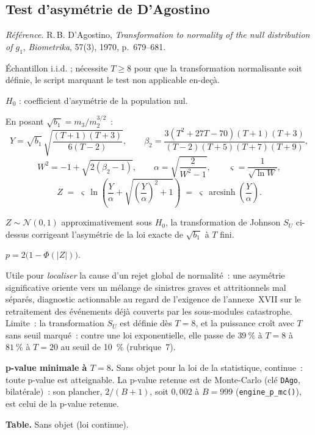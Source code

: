 \documentclass[a4paper,11pt]{article}
\newcommand{\code}[1]{\texttt{\small #1}}
\newcommand{\refl}[1]{{\small\textcolor{maincolor!70!black}{\textit{Référence.} #1}}\par\smallskip}
\newcounter{ficheid}
\newenvironment{fiche}[1]{%
  \stepcounter{ficheid}%
  \phantomsection
  \subsection{#1}%
  \label{fiche:\theficheid}%
}{%
  \end{description}\vspace{0.5em}%
}
\newcommand{\Cadre}{%
  \begin{description}[leftmargin=0pt, style=unboxed, itemsep=3pt, topsep=3pt, parsep=2pt]%
  \item[\textcolor{financeblue}{\textbf{1. Cadre, notations et hypothèses de validité (non testées).}}]}
\newcommand{\Hzero}{\item[\textcolor{financeblue}{\textbf{2. Hypothèse nulle.}}]}
\newcommand{\Stat}{\item[\textcolor{financeblue}{\textbf{3. Statistique de test.}}]}
\newcommand{\Loi}{\item[\textcolor{financeblue}{\textbf{4. Loi sous $H_0$.}}]}
\newcommand{\Pval}{\item[\textcolor{financeblue}{\textbf{5. p-value.}}]}
\newcommand{\Usage}{\item[\textcolor{financeblue}{\textbf{6. Usage et limites.}}]}
\newcommand{\Pertinence}{\item[\textcolor{financeblue}{\textbf{7. Pertinence et puissance à faible $T$.}}]}
\begin{document}
\begin{fiche}{Test d'asymétrie de D'Agostino}
\label{fiche:dagostino-asymetrie}%
\refl{R.\,B. D'Agostino, \emph{Transformation to normality of the null distribution of $g_1$},
\emph{Biometrika}, 57(3), 1970, p.~679--681.}
\Cadre
Échantillon i.i.d. ; nécessite $T \ge 8$ pour que la transformation normalisante soit définie, le
script marquant le test non applicable en-deçà.
\Hzero
$H_0$ : coefficient d'asymétrie de la population nul.
\Stat
En posant $\sqrt{b_1} = m_3/m_2^{3/2}$~:
\[
  Y = \sqrt{b_1}\,\sqrt{\frac{(T+1)(T+3)}{6(T-2)}},
  \qquad
  \beta_2 = \frac{3(T^2+27T-70)(T+1)(T+3)}{(T-2)(T+5)(T+7)(T+9)},
\]
\[
  W^2 = -1 + \sqrt{2(\beta_2-1)},\qquad
  \alpha = \sqrt{\frac{2}{W^2-1}},\qquad
  \varsigma = \frac{1}{\sqrt{\ln W}},
\]
\[
  Z \;=\; \varsigma \,\ln\!\left(\frac{Y}{\alpha} + \sqrt{\left(\frac{Y}{\alpha}\right)^2 + 1}\right)
    \;=\; \varsigma\,\operatorname{arcsinh}\!\left(\frac{Y}{\alpha}\right).
\]
\Loi
$Z \sim \mathcal{N}(0,1)$ approximativement sous $H_0$, la transformation de Johnson $S_U$
ci-dessus corrigeant l'asymétrie de la loi exacte de $\sqrt{b_1}$ à $T$ fini.
\Pval
$p = 2\big(1 - \Phi(|Z|)\big)$.
\Usage
Utile pour \emph{localiser} la cause d'un rejet global de normalité~: une asymétrie significative
oriente vers un mélange de sinistres graves et attritionnels mal séparés, diagnostic actionnable
au regard de l'exigence de l'annexe~XVII sur le retraitement des événements déjà couverts par les
sous-modules catastrophe. Limite~: la transformation $S_U$ est définie dès $T = 8$, et la puissance
croît avec $T$ sans seuil marqué~: contre une loi exponentielle, elle passe de $39~\%$ à $T = 8$ à
$81~\%$ à $T = 20$ au seuil de 10~\% (rubrique~7).
\Pertinence
\textbf{p-value minimale à $T = 8$.} Sans objet pour la loi de la statistique, continue~: toute p-value est atteignable. La p-value retenue est de Monte-Carlo (clé \code{DAgo}, bilatérale)~: son plancher, $2/(B+1)$, soit $0{,}002$ à $B = 999$ (\code{engine\_p\_mc()}), est celui de la p-value retenue.

\textbf{Table.} Sans objet (loi continue).


\end{fiche}
\end{document}
